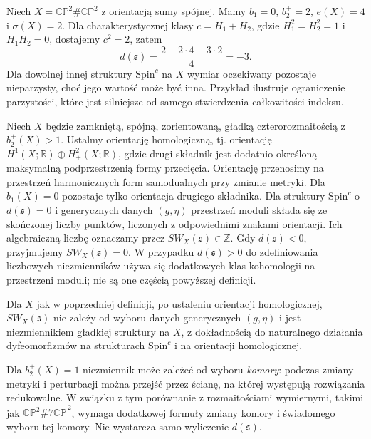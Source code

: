 \begin{przyklad}
\label{ex:tg-sw-index-parity}
Niech $X=\mathbb{CP}^2\#\mathbb{CP}^2$
z orientacją sumy spójnej.
Mamy $b_1=0$, $b_2^+=2$, $e(X)=4$
i $\sigma(X)=2$. Dla charakterystycznej
klasy $c=H_1+H_2$, gdzie
$H_1^2=H_2^2=1$ i $H_1H_2=0$,
dostajemy $c^2=2$, zatem
\[
d(\mathfrak s)=\frac{2-2\cdot4-3\cdot2}{4}
=-3.
\]
Dla dowolnej innej struktury
$\mathrm{Spin}^c$ na $X$ wymiar
oczekiwany pozostaje nieparzysty,
choć jego wartość może być inna.
Przykład ilustruje ograniczenie
parzystości, które jest silniejsze
od samego stwierdzenia
całkowitości indeksu.
\end{przyklad}

\begin{definicja}
Niech $X$ będzie zamkniętą, spójną, zorientowaną,
gładką czterorozmaitością z $b_2^+(X)>1$.
Ustalmy orientację homologiczną, tj. orientację
$H^1(X;\mathbb R)\oplus H^2_+(X;\mathbb R)$,
gdzie drugi składnik jest dodatnio określoną
maksymalną podprzestrzenią formy przecięcia.
Orientację przenosimy na przestrzeń harmonicznych
form samodualnych przy zmianie metryki.
Dla $b_1(X)=0$ pozostaje tylko orientacja
drugiego składnika.
Dla struktury $\mathrm{Spin}^c$ o $d(\mathfrak s)=0$
i generycznych danych $(g,\eta)$ przestrzeń moduli
składa się ze skończonej liczby punktów, liczonych
z odpowiednimi znakami orientacji. Ich algebraiczną
liczbę oznaczamy przez $SW_X(\mathfrak s)\in\mathbb Z$.
Gdy $d(\mathfrak s)<0$, przyjmujemy $SW_X(\mathfrak s)=0$.
W przypadku $d(\mathfrak s)>0$ do zdefiniowania
liczbowych niezmienników używa się dodatkowych klas
kohomologii na przestrzeni moduli; nie są one częścią
powyższej definicji.
\end{definicja}

\begin{twierdzenie}
Dla $X$ jak w poprzedniej definicji, po ustaleniu
orientacji homologicznej, $SW_X(\mathfrak s)$ nie zależy
od wyboru danych generycznych $(g,\eta)$ i jest
niezmiennikiem gładkiej struktury na $X$, z dokładnością
do naturalnego działania dyfeomorfizmów na strukturach
$\mathrm{Spin}^c$ i na orientacji homologicznej.
\end{twierdzenie}

\begin{uwaga}[Przypadek $b_2^+=1$]
Dla $b_2^+(X)=1$ niezmiennik może zależeć od wyboru
\emph{komory}: podczas zmiany metryki i perturbacji
można przejść przez ścianę, na której występują
rozwiązania redukowalne. W związku z tym porównanie
z rozmaitościami wymiernymi, takimi jak
$\mathbb{CP}^2\#7\overline{\mathbb{CP}}^{\,2}$,
wymaga dodatkowej formuły zmiany komory i świadomego
wyboru tej komory. Nie wystarcza samo wyliczenie
$d(\mathfrak s)$.
\end{uwaga}

